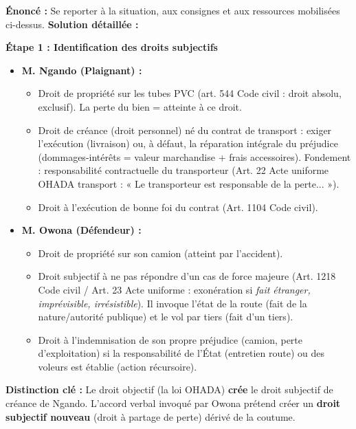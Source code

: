 \documentclass[11pt]{article}
\newcommand{\cle}[1]{{\popxbold\color{popdark}#1}}
\newcounter{popsec}
\newcounter{popsub}
\newcommand{\courssub}[1]{%
  \stepcounter{popsub}%
  \par\vspace{9pt}\noindent{\popxbold\fontsize{11.5}{13}\selectfont\color{popink}{\color{poporange}\thepopsec.\thepopsub}\hspace{6pt}#1}\par\nopagebreak\vspace{4pt}
}
\begin{document}
\courssub{Démarche et corrigé commenté}
\begin{exoresolu}
\textbf{Énoncé :} Se reporter à la situation, aux consignes et aux ressources mobilisées ci-dessus.
\tcblower
\textbf{Solution détaillée :}

\textbf{Étape 1 : Identification des droits subjectifs}
\begin{itemize}
    \item \textbf{M. Ngando (Plaignant) :}
    \begin{itemize}
        \item \cle{Droit de propriété} sur les tubes PVC (art. 544 Code civil : droit absolu, exclusif). La perte du bien = atteinte à ce droit.
        \item \cle{Droit de créance} (droit personnel) né du contrat de transport : exiger l'exécution (livraison) ou, à défaut, la \cle{réparation intégrale du préjudice} (dommages-intérêts = valeur marchandise + frais accessoires). Fondement : responsabilité contractuelle du transporteur (Art. 22 Acte uniforme OHADA transport : « Le transporteur est responsable de la perte... »).
        \item \cle{Droit à l'exécution de bonne foi} du contrat (Art. 1104 Code civil).
    \end{itemize}
    \item \textbf{M. Owona (Défendeur) :}
    \begin{itemize}
        \item \cle{Droit de propriété} sur son camion (atteint par l'accident).
        \item \cle{Droit subjectif à ne pas répondre d'un cas de force majeure} (Art. 1218 Code civil / Art. 23 Acte uniforme : exonération si \textit{fait étranger, imprévisible, irrésistible}). Il invoque l'état de la route (fait de la nature/autorité publique) et le vol par tiers (fait d'un tiers).
        \item \cle{Droit à l'indemnisation} de son propre préjudice (camion, perte d'exploitation) si la responsabilité de l'État (entretien route) ou des voleurs est établie (action récursoire).
    \end{itemize}
\end{itemize}
\textbf{Distinction clé :} Le droit objectif (la loi OHADA) \textbf{crée} le droit subjectif de créance de Ngando. L'accord verbal invoqué par Owona prétend créer un \textbf{droit subjectif nouveau} (droit à partage de perte) dérivé de la coutume.


\end{exoresolu}
\end{document}
